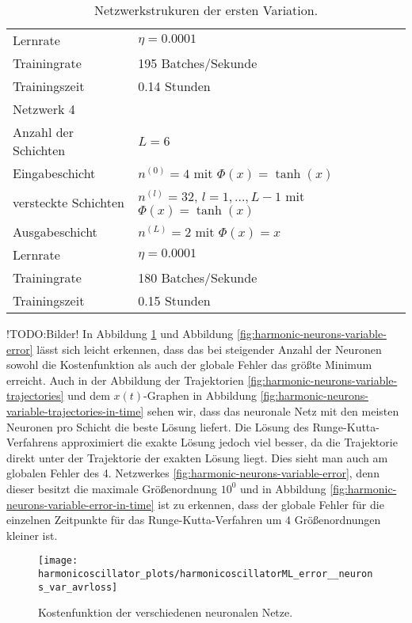 \begin{table}
\begin{tabular}{ l | l }
              Lernrate & $\eta=0.0001$ \\
              Trainingrate & 195 Batches/Sekunde \\
              Trainingszeit & 0.14 Stunden \\
              \hline
              Netzwerk 4 & \\
              \hline
              Anzahl der Schichten & $L=6$ \\
              Eingabeschicht & $n^{(0)}=4$ mit $\Phi(x)=\tanh(x)$ \\
              versteckte Schichten & $n^{(l)}=32$, $l = 1, \dots, L-1$ mit $\Phi(x)=\tanh(x)$ \\
              Ausgabeschicht & $n^{(L)}=2$ mit $\Phi(x)=x$ \\
              Lernrate & $\eta=0.0001$ \\
              Trainingrate & 180 Batches/Sekunde \\
              Trainingszeit & 0.15 Stunden \\
              \hline
       \end{tabular}
       \caption{Netzwerkstrukuren der ersten Variation.}
       \label{stiff-table-first}
\end{table}
!TODO:Bilder!
In Abbildung \ref{fig:harmonic-neurons-variable-loss} und Abbildung \ref{fig:harmonic-neurons-variable-error} lässt
sich leicht erkennen, dass das bei steigender Anzahl der Neuronen sowohl die Kostenfunktion als auch der globale Fehler
das größte Minimum erreicht. Auch in der Abbildung der Trajektorien \ref{fig:harmonic-neurons-variable-trajectories}
und dem $x(t)$-Graphen in Abbildung \ref{fig:harmonic-neurons-variable-trajectories-in-time}
sehen wir, dass das neuronale Netz mit den meisten Neuronen pro Schicht die beste Lösung liefert. Die Lösung des
Runge-Kutta-Verfahrens approximiert die exakte Lösung jedoch viel besser, da die Trajektorie direkt unter der
Trajektorie der exakten Lösung liegt. Dies sieht man auch am globalen Fehler des 4. Netzwerkes
\ref{fig:harmonic-neurons-variable-error}, denn dieser besitzt die maximale Größenordnung $10^0$ und in
Abbildung \ref{fig:harmonic-neurons-variable-error-in-time} ist zu erkennen, dass der globale Fehler für die einzelnen
Zeitpunkte für das Runge-Kutta-Verfahren um $4$ Größenordnungen kleiner ist.
\begin{figure}
       \centering
       \texttt{[image: harmonicoscillator\_plots/harmonicoscillatorML\_error\_\_neurons\_var\_avrloss]}
       \caption{Kostenfunktion der verschiedenen neuronalen Netze.}
       \label{fig:harmonic-neurons-variable-loss}
\end{figure}
